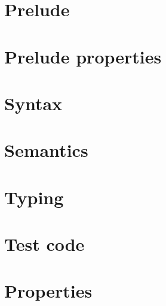 \documentclass[a4paper, oneside, 10pt, draft]{memoir}
\begin{document}
\section{Prelude}
\section{Prelude properties}
\section{Syntax}
\section{Semantics}
\section{Typing}
\section{Test code}
\section{Properties}
\end{document}
